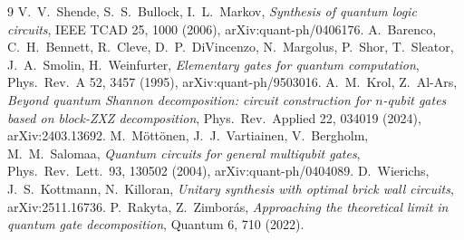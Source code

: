\documentclass[11pt]{article}
\begin{document}
\begin{thebibliography}{9}
 V.~V.~Shende, S.~S.~Bullock, I.~L.~Markov, \emph{Synthesis of quantum logic
circuits}, IEEE TCAD 25, 1000 (2006), arXiv:quant-ph/0406176.
 A.~Barenco, C.~H.~Bennett, R.~Cleve, D.~P.~DiVincenzo, N.~Margolus, P.~Shor,
T.~Sleator, J.~A.~Smolin, H.~Weinfurter, \emph{Elementary gates for quantum computation}, Phys.\
Rev.\ A 52, 3457 (1995), arXiv:quant-ph/9503016.
 A.~M.~Krol, Z.~Al-Ars, \emph{Beyond quantum Shannon decomposition: circuit
construction for $n$-qubit gates based on block-ZXZ decomposition}, Phys.\ Rev.\ Applied 22,
034019 (2024), arXiv:2403.13692.
 M.~M\"ott\"onen, J.~J.~Vartiainen, V.~Bergholm, M.~M.~Salomaa,
\emph{Quantum circuits for general multiqubit gates}, Phys.\ Rev.\ Lett.\ 93, 130502 (2004),
arXiv:quant-ph/0404089.
 D.~Wierichs, J.~S.~Kottmann, N.~Killoran, \emph{Unitary synthesis with optimal
brick wall circuits}, arXiv:2511.16736.
 P.~Rakyta, Z.~Zimbor\'as, \emph{Approaching the theoretical limit in quantum
gate decomposition}, Quantum 6, 710 (2022).
\end{thebibliography}
\end{document}
